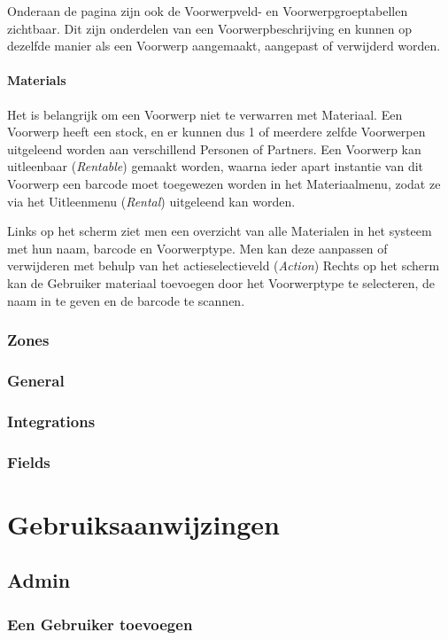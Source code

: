 \documentclass[]{memoir}
\begin{document}
Onderaan de pagina zijn ook de Voorwerpveld- en Voorwerpgroeptabellen zichtbaar. Dit zijn onderdelen van een Voorwerpbeschrijving en kunnen op dezelfde manier als een Voorwerp aangemaakt, aangepast of verwijderd worden.

\subsubsection{Materials}

Het is belangrijk om een Voorwerp niet te verwarren met Materiaal. Een Voorwerp heeft een stock, en er kunnen dus 1 of meerdere zelfde Voorwerpen uitgeleend worden aan verschillend Personen of Partners. Een Voorwerp kan uitleenbaar (\textsl{Rentable}) gemaakt worden, waarna ieder apart instantie van dit Voorwerp een barcode moet toegewezen worden in het Materiaalmenu, zodat ze via het Uitleenmenu (\textsl{Rental}) uitgeleend kan worden.

Links op het scherm ziet men een overzicht van alle Materialen in het systeem met hun naam, barcode en Voorwerptype. Men kan deze aanpassen of verwijderen met behulp van het actieselectieveld (\textsl{Action})
Rechts op het scherm kan de Gebruiker materiaal toevoegen door het Voorwerptype te selecteren, de naam in te geven en de barcode te scannen.

\subsection{Zones}
\subsection{General}
\subsection{Integrations}
\subsection{Fields}

\chapter{Gebruiksaanwijzingen}

\section{Admin}
\subsection{Een Gebruiker toevoegen}
\end{document}
